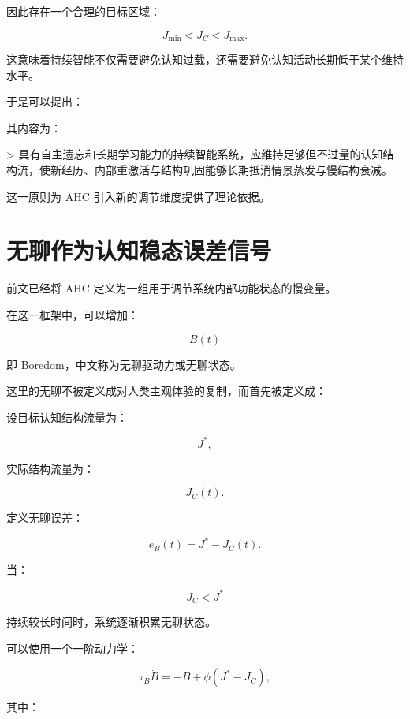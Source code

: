 因此存在一个合理的目标区域：

\[
\boxed{
J_{\min}
<
J_C
<
J_{\max}.
}
\]

这意味着持续智能不仅需要避免认知过载，还需要避免认知活动长期低于某个维持水平。

于是可以提出：

\begin{statementbox}
\centering
{}
\end{statementbox}

其内容为：

> 具有自主遗忘和长期学习能力的持续智能系统，应维持足够但不过量的认知结构流，使新经历、内部重激活与结构巩固能够长期抵消情景蒸发与慢结构衰减。

这一原则为 AHC 引入新的调节维度提供了理论依据。

\section{无聊作为认知稳态误差信号}

前文已经将 AHC 定义为一组用于调节系统内部功能状态的慢变量。

在这一框架中，可以增加：

\[
\boxed{
B(t)
}
\]

即 Boredom，中文称为无聊驱动力或无聊状态。

这里的无聊不被定义成对人类主观体验的复制，而首先被定义成：

\begin{statementbox}
\centering
{}
\end{statementbox}

设目标认知结构流量为：

\[
J^*,
\]

实际结构流量为：

\[
J_C(t).
\]

定义无聊误差：

\[
\boxed{
e_B(t)
=
J^*-J_C(t).
}
\]

当：

\[
J_C<J^*
\]

持续较长时间时，系统逐渐积累无聊状态。

可以使用一个一阶动力学：

\[
\boxed{
\tau_B\dot B
=
-B
+
\phi
\left(
J^*-J_C
\right),
}
\]

其中：

